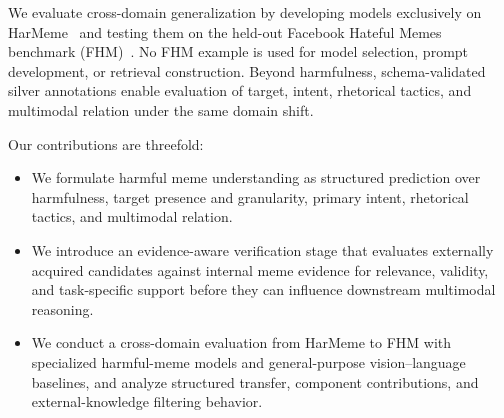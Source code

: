We evaluate cross-domain generalization by developing models exclusively on
HarMeme~\cite{pramanick2021harmeme,pramanick2021momenta} and testing them on
the held-out Facebook Hateful Memes benchmark
(FHM)~\cite{kiela2020hateful}.  No FHM example is used for model selection, prompt development, or
retrieval construction.  Beyond harmfulness, schema-validated silver
annotations enable evaluation of target, intent, rhetorical tactics, and
multimodal relation under the same domain shift.

Our contributions are threefold:
\begin{itemize}
    \item
    We formulate harmful meme understanding as structured prediction over
    harmfulness, target presence and granularity, primary intent,
    rhetorical tactics, and multimodal relation.

    \item
    We introduce an evidence-aware verification stage that evaluates
    externally acquired candidates against internal meme evidence for
    relevance, validity, and task-specific support before they can
    influence downstream multimodal reasoning.

    \item
    We conduct a cross-domain evaluation from HarMeme to FHM with
    specialized harmful-meme models and general-purpose vision--language
    baselines, and analyze structured transfer, component contributions,
    and external-knowledge filtering behavior.
\end{itemize}
